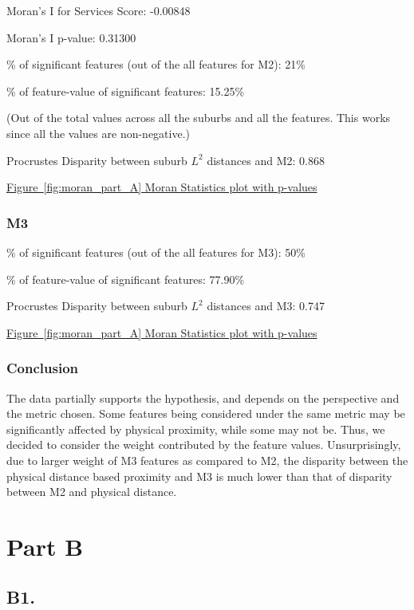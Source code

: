 \documentclass[
	a4paper, %
	10pt, %
	unnumberedsections, %
	twoside, %
]{LTJournalArticle}
\begin{document}
Moran's I for Services Score: -0.00848

Moran's I p-value: 0.31300

\% of significant features (out of the all features for M2): 21\%

\% of feature-value of significant features: 15.25\%

(Out of the total values across all the suburbs and all the features. This works since all the values are non-negative.)

Procrustes Disparity between suburb $L^2$ distances and M2: 0.868

\hyperref[fig:moran_part_A]{Figure~\ref{fig:moran_part_A} Moran Statistics plot with p-values}


\subsubsection{M3}\leavevmode

\% of significant features (out of the all features for M3): 50\%

\% of feature-value of significant features: 77.90\%

Procrustes Disparity between suburb $L^2$ distances and M3: 0.747

\hyperref[fig:moran_part_A]{Figure~\ref{fig:moran_part_A} Moran Statistics plot with p-values}


\subsubsection{Conclusion}\leavevmode

The data partially supports the hypothesis, and depends on the perspective and the metric chosen. Some features being considered under the same metric may be significantly affected by physical proximity, while some may not be. Thus, we decided to consider the weight contributed by the feature values. Unsurprisingly, due to larger weight of M3 features as compared to M2, the disparity between the physical distance based proximity and M3 is much lower than that of disparity between M2 and physical distance.

\pagebreak

\section{Part B}

\subsection{B1.}
\end{document}
